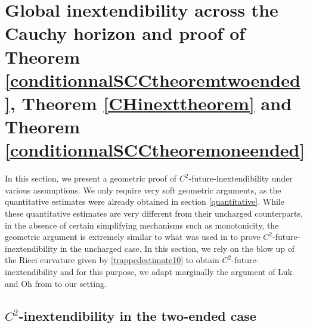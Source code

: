 \documentclass[10pt,a4paper]{article}
\theoremstyle{plain}
\theoremstyle{remark}
\theoremstyle{definition}
\theoremstyle{plain}
\theoremstyle{remark}
\theoremstyle{definition}
\numberwithin{equation}{section}
\begin{document}
\section{Global inextendibility across the Cauchy horizon and proof of \\ Theorem \ref{conditionnalSCCtheoremtwoended}, Theorem \ref{CHinexttheorem} and Theorem \ref{conditionnalSCCtheoremoneended}} \label{inextproofsection}

In this section, we present a geometric proof of $C^2$-future-inextendibility under various assumptions. We only require very soft geometric arguments, as the quantitative estimates were already obtained in section \ref{quantitative}. While these quantitative estimates are very different from their uncharged counterparts, in the absence of certain simplifying mechanisms such as monotonicity, the geometric argument is extremely similar to what was used in \cite{JonathanStab} to prove $C^2$-future-inextendibility in the uncharged case. In this section, we rely on the blow up of the Ricci curvature given by \eqref{trappedestimate10} to obtain $C^2$-future-inextendibility and for this purpose, we adapt marginally the argument of Luk and Oh from \cite{JonathanStab} to our setting.











\subsection{$C^2$-inextendibility in the two-ended case}
\end{document}
